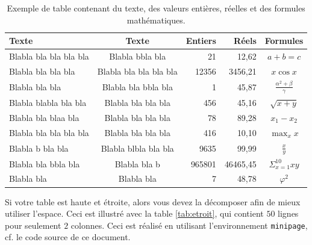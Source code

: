 \documentclass{ASD}
\begin{document}
\begin{table}[htb]
	\centering
	\begin{tabular}{l c r r c}
		\hline
		\rowcolor{DarkColor} 
		\textbf{Texte} 			& \textbf{Texte}			& \textbf{Entiers}	& \textbf{Réels}	& \textbf{Formules}	\\ 
		\hline
		Blabla bla bla bla bla	& Blabla bbla bla			& 21 				& 12,62				& $a+b=c$								\\
		Blabla bla bla bla		& Blabla bla bla bla bla	& 12356 			& 3456,21			& $x\cos{x}$							\\
		Blabla bla bla			& Blabla bla bbla bla		& 1 				& 45,87				& $\frac{\alpha^{2}+\beta}{\gamma}$	\\
		Blabla blabla bla bla	& Blabla bla bla bla		& 456 				& 45,16				& $\sqrt{x+y}$	\\
		Blabla bla blaa bla		& Blabla bla bla bla		& 78 				& 89,28				& $x_{1}-x_{2}$	\\
		Blabla bla bla bla bla	& Blabla bla bla bla		& 416 				& 10,10				& $\max_{x}{x}$	\\
		Blabla b bla bla		& Blabla blbla bla bla		& 9635 				& 99,99				& $\frac{x}{y}$	\\
		Blabla bla bbla bla		& Blabla bla b				& 965801 			& 46465,45			& $\Sigma_{x=1}^{10}{xy}$	\\
		Blabla bla				& Blabla bla				& 7 				& 48,78				& $\varphi^2$	\\
		\hline
	\end{tabular}
	\caption{Exemple de table contenant du texte, des valeurs entières, réelles et des formules mathématiques.}
	\label{tab:exemple}
\end{table}

Si votre table est haute et étroite, alors vous devez la décomposer afin de mieux utiliser l'espace. Ceci est illustré avec la table \ref{tab:etroit}, qui contient $50$ lignes pour seulement $2$ colonnes. Ceci est réalisé en utilisant l'environnement \texttt{minipage}, cf. le code source de ce document.
	
\end{document}
